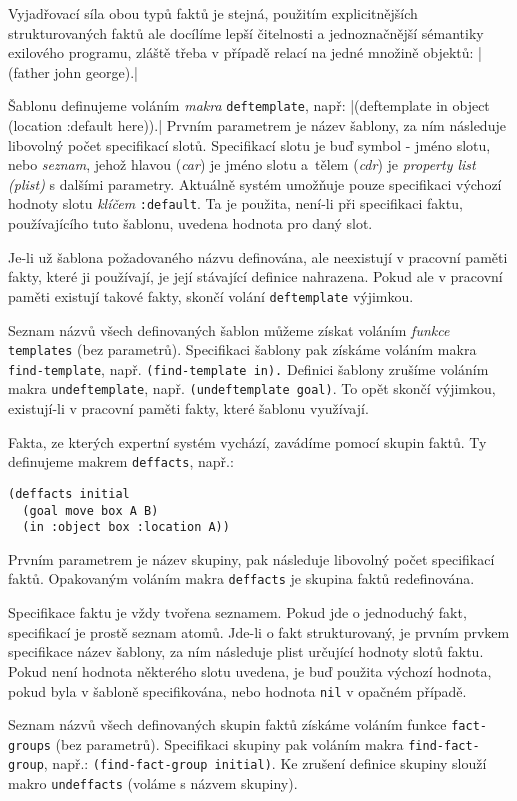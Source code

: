 Vyjadřovací síla obou typů faktů je stejná, použitím explicitnějších
strukturovaných faktů ale docílíme lepší čitelnosti a jednoznačnější sémantiky
exilového programu, zláště třeba v případě relací na jedné množině objektů:
\cl|(father john george).|

Šablonu definujeme voláním \emph{makra} \verb|deftemplate|, např:
\cl|(deftemplate in object (location :default here)).| Prvním parametrem je
název šablony, za ním následuje libovolný počet specifikací slotů. Specifikací
slotu je buď symbol - jméno slotu, nebo \emph{seznam}, jehož hlavou
(\emph{car}) je jméno slotu a~tělem (\emph{cdr}) je \emph{property list (plist)}
s dalšími parametry. Aktuálně systém umožňuje pouze specifikaci výchozí hodnoty
slotu \emph{klíčem} \verb|:default|. Ta je použita, není-li při specifikaci
faktu, používajícího tuto šablonu, uvedena hodnota pro daný slot.

Je-li už šablona požadovaného názvu definována, ale neexistují v pracovní
paměti fakty, které ji používají, je její stávající definice nahrazena. Pokud
ale v pracovní paměti existují takové fakty, skončí volání \verb|deftemplate|
výjimkou.

Seznam názvů všech definovaných šablon můžeme získat voláním \emph{funkce}
\verb|templates| (bez parametrů). Specifikaci šablony pak získáme voláním makra
\verb|find-template|, např. \verb|(find-template in).| Definici šablony zrušíme
voláním makra \verb|undeftemplate|, např. \verb|(undeftemplate goal)|. To opět
skončí výjimkou, existují-li v pracovní paměti fakty, které šablonu využívají.

Fakta, ze kterých expertní systém vychází, zavádíme pomocí skupin faktů. Ty
definujeme makrem \verb|deffacts|, např.:
\begin{verbatim}
(deffacts initial
  (goal move box A B)
  (in :object box :location A))
\end{verbatim}
Prvním parametrem je název skupiny, pak následuje libovolný počet specifikací
faktů. Opakovaným voláním makra \verb|deffacts| je skupina faktů
redefinována.

Specifikace faktu je vždy tvořena seznamem. Pokud jde o jednoduchý fakt,
specifikací je prostě seznam atomů. Jde-li o fakt strukturovaný, je prvním
prvkem specifikace název šablony, za ním následuje plist určující hodnoty slotů
faktu. Pokud není hodnota některého slotu uvedena, je buď použita
výchozí hodnota, pokud byla v šabloně specifikována, nebo hodnota \verb|nil| v
opačném případě.

Seznam názvů všech definovaných skupin faktů získáme voláním funkce
\verb|fact-groups| (bez parametrů). Specifikaci skupiny pak voláním makra
\verb|find-fact-group|, např.: \verb|(find-fact-group initial)|. Ke zrušení
definice skupiny slouží makro \verb|undeffacts| (voláme s názvem skupiny).

